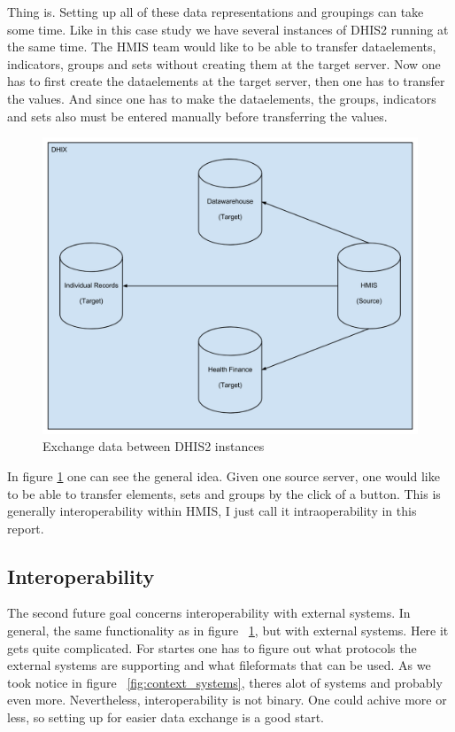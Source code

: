 Thing is. Setting up all of these data representations and groupings can take some time. 
Like in this case study we have several instances of DHIS2 running at the same time. 
The HMIS team would like to be able to transfer dataelements, indicators, groups and sets without creating them at the target server.
Now one has to first create the dataelements at the target server, then one has to transfer the values. 
And since one has to make the dataelements, the groups, indicators and sets also must be entered manually before transferring the values.
\begin{figure}
\centering
\includegraphics[width=12cm]{empirical/images/intraoperability}
\caption{Exchange data between DHIS2 instances}
\label{fig:intraoperability}
\end{figure}
In figure \ref{fig:intraoperability} one can see the general idea. Given one source server, one would like to be able to transfer elements, sets and groups by the click of a button.
This is generally interoperability within HMIS, I just call it intraoperability in this report.
\subsection{Interoperability}

The second future goal concerns interoperability with external systems.
In general, the same functionality as in figure ~\ref{fig:intraoperability}, but with external systems.
Here it gets quite complicated. For startes one has to figure out what protocols the external systems are supporting and what fileformats that can be used.
As we took notice in figure ~\ref{fig:context_systems}, theres alot of systems and probably even more.
Nevertheless, interoperability is not binary. One could achive more or less, so setting up for easier data exchange is a good start.

